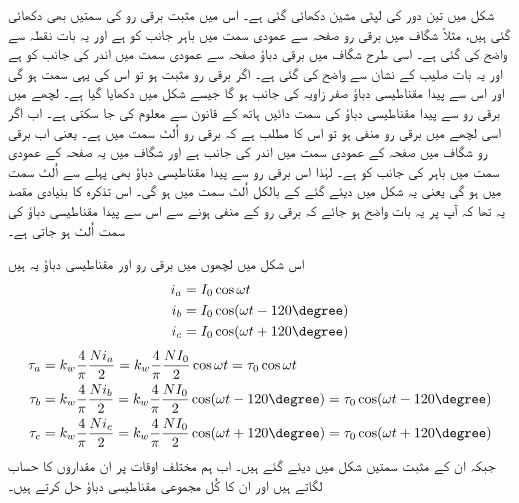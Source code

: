شکل  میں تین دور کی لپٹی مشین دکھائی گئی ہے۔ اس میں مثبت برقی رو کی سمتیں بھی دکھائی گئی ہیں، مثلاً  شگاف میں برقی رو صفحہ سے عمودی سمت میں باہر جانب کو ہے اور یہ بات نقطہ سے واضح کی گئی ہے۔ اسی طرح  شگاف میں برقی دباؤ صفحہ سے عمودی سمت میں اندر کی جانب کو ہے اور یہ بات صلیب کے نشان سے واضح کی گئی ہے۔ اگر برقی رو مثبت ہو تو اس کی یہی سمت ہو گی اور اس سے پیدا مقناطیسی دباؤ  صفر زاویہ کی جانب ہو گا جیسے شکل میں دکھایا گیا ہے۔ لچھے میں برقی رو سے پیدا مقناطیسی دباؤ کی سمت دائیں ہاتھ کے قانون سے معلوم کی جا سکتی ہے۔ اب اگر اسی لچھے میں برقی رو منفی ہو تو اس کا مطلب ہے کہ برقی رو اُلٹ سمت میں ہے۔ یعنی اب برقی رو  شگاف میں صفحہ کے عمودی سمت میں اندر کی جانب ہے اور  شگاف میں یہ صفحہ کے عمودی سمت میں باہر کی جانب کو ہے۔ لہٰذا اس برقی رو سے پیدا مقناطیسی دباؤ بھی پہلے سے اُلٹ سمت میں ہو گی یعنی یہ شکل میں دیئے گئے    کے بالکل اُلٹ سمت میں ہو گی۔ اس تذکرہ کا بنیادی مقصد یہ تھا کہ آپ پر یہ بات واضح ہو جائے کہ برقی رو کے منفی ہونے سے اس سے پیدا مقناطیسی دباؤ کی سمت اُلٹ ہو جاتی ہے۔

اس شکل میں لچھوں میں برقی رو اور مقناطیسی دباؤ یہ ہیں
\begin{gather}
\begin{aligned}
i_a&=I_0 \cos \omega t\\
i_b&=I_0 \cos (\omega t-120\degree)\\
i_c&=I_0 \cos (\omega t+120\degree)
\end{aligned}
\end{gather}
%
\begin{gather}
\begin{aligned}
\tau_a&=k_w \frac{4}{\pi}\frac{N i_a}{2}=k_w \frac{4}{\pi}\frac{N I_0}{2} \cos \omega t=\tau_0 \cos \omega t\\
\tau_b&=k_w \frac{4}{\pi}\frac{N i_b}{2}=k_w \frac{4}{\pi}\frac{N I_0}{2} \cos (\omega t-120\degree)=\tau_0 \cos (\omega t-120\degree)\\
\tau_c&=k_w \frac{4}{\pi}\frac{N i_c}{2}=k_w \frac{4}{\pi}\frac{N I_0}{2} \cos (\omega t+120\degree)=\tau_0 \cos (\omega t+120\degree)
\end{aligned}
\end{gather}
جبکہ ان کے مثبت سمتیں شکل میں دیئے گئے ہیں۔ اب ہم مختلف اوقات پر ان مقداروں کا حساب لگاتے ہیں اور ان کا کُل مجموعی مقناطیسی دباؤ حل کرتے ہیں۔


